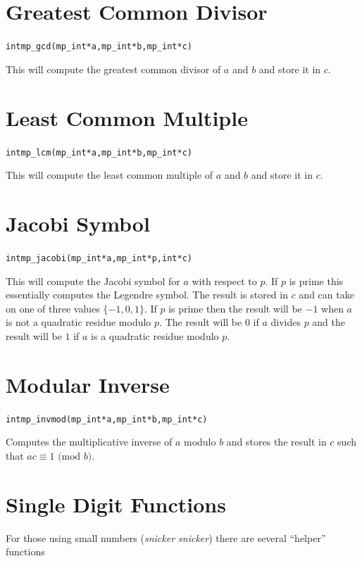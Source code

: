 \documentclass[synpaper]{book}
\begin{document}
\section{Greatest Common Divisor}
\begin{alltt}
int mp_gcd (mp_int * a, mp_int * b, mp_int * c)
\end{alltt}
This will compute the greatest common divisor of $a$ and $b$ and store it in $c$.

\section{Least Common Multiple}
\begin{alltt}
int mp_lcm (mp_int * a, mp_int * b, mp_int * c)
\end{alltt}
This will compute the least common multiple of $a$ and $b$ and store it in $c$.

\section{Jacobi Symbol}
\begin{alltt}
int mp_jacobi (mp_int * a, mp_int * p, int *c)
\end{alltt}
This will compute the Jacobi symbol for $a$ with respect to $p$.  If $p$ is prime this essentially computes the Legendre
symbol.  The result is stored in $c$ and can take on one of three values $\lbrace -1, 0, 1 \rbrace$.  If $p$ is prime
then the result will be $-1$ when $a$ is not a quadratic residue modulo $p$.  The result will be $0$ if $a$ divides $p$
and the result will be $1$ if $a$ is a quadratic residue modulo $p$.  

\section{Modular Inverse}
\begin{alltt}
int mp_invmod (mp_int * a, mp_int * b, mp_int * c)
\end{alltt}
Computes the multiplicative inverse of $a$ modulo $b$ and stores the result in $c$ such that $ac \equiv 1 \mbox{ (mod }b\mbox{)}$.

\section{Single Digit Functions}

For those using small numbers (\textit{snicker snicker}) there are several ``helper'' functions
\end{document}
